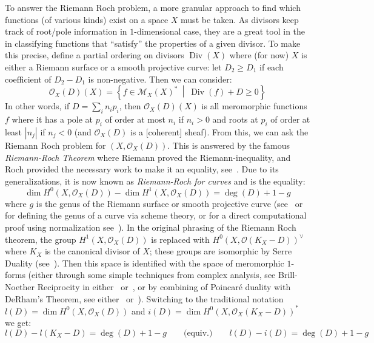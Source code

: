 \documentclass{book}
\newcommand{\CM}{{\mathcal{M}}}
\newcommand{\CO}{{\mathcal{O}}}
\renewcommand{\deg}{{\operatorname{deg}}}
\renewcommand{\div}{{\operatorname{Div}}}
\newcommand{\set}[2]{\left\{#1 \ \middle|\ #2\right\}}
\begin{document}
To answer the Riemann Roch problem, a more granular approach to find which functions (of various kinds) exist
on a space $X$ must be taken. As divisors keep track of root/pole information in $1$-dimensional case, they
are a great tool in the in classifying functions that ``satisfy'' the properties of a given divisor. To make
this precise, define a partial ordering on divisors $\div(X)$ where (for now) $X$ is either a Riemann surface
or a smooth projective curve: let $D_2 \ge D_1$ if each coefficient of $D_2 - D_1$ is non-negative. Then we
can consider:
\[
  \CO_X(D)(X) = \set{f \in \CM_X(X)^*}{\div(f) + D \ge 0}
\]
In other words, if $D =\sum_i n_ip_i$, then $\CO_X(D)(X)$ is all meromorphic functions $f$ where it has a pole
at $p_i$ of order at most $n_i$ if $n_i > 0$ and roots at $p_i$ of order at least $|n_j|$ if $n_j < 0$ (and
$\CO_X(D)$ is a [coherent] sheaf). From this, we can ask the Riemann Roch problem for $(X, \CO_X(D))$. This is
answered by the famous \emph{Riemann-Roch Theorem} where Riemann proved the Riemann-inequality, and Roch
provided the necessary work to make it an equality, see~\cite{a.griffithsIntroductionAlgebraicCurves}. Due to
its generalizations, it is now known as \emph{Riemann-Roch for curves} and is the equality:
\begin{equation}\label{eq:riemannRoch1dIntro}
  \dim H^0(X, \CO_X(D)) - \dim H^1(X, \CO_X(D)) = \deg(D)+1-g
\end{equation}
where $g$ is the genus of the Riemann surface or smooth projective curve
(see~\cite{hartshorneAlgebraicGeometry2013} or~\cite{NateAlgGeo} for defining the genus of a curve via scheme
theory, or for a
direct computational proof using normalization see~\cite{NateComplexAnalysis}). In the original phrasing of the Riemann Roch
theorem, the group $H^1(X, \CO_X(D))$ is replaced with  $H^0(X, \CO(K_X-D))^\vee$ where $K_X$ is the canonical
divisor of $X$; these groups are isomorphic by Serre Duality (see~\cite[section~6.3]{NateAlgGeo}). Then this
space is identified with the space of meromorphic $1$-forms (either through some simple techniques from
complex analysis, see Brill-Noether Reciprocity in either~\cite{a.griffithsIntroductionAlgebraicCurves}
or~\cite{NateComplexAnalysis}, or by combining of Poincar\'e duality with DeRham's Theorem, see
either~\cite{leeIntroductionRiemannianManifolds2018} or~\cite{NateDiffGeo}). Switching to the traditional
notation $l(D) = \dim H^0(X, \CO_X(D))$ and $i(D) = \dim H^0(X, \CO_X(K_X-D))^*$ we get:
\[
  l(D) - l(K_X-D) = \deg(D) + 1-g \qquad \text{(equiv.)} \qquad l(D) - i(D) = \deg(D) + 1-g
\]
\end{document}
